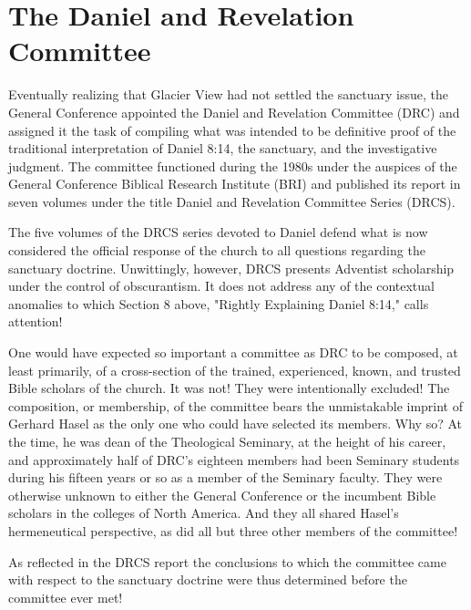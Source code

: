 \chapter{The Daniel and Revelation Committee}
\label{ch:committee}

Eventually realizing that Glacier View had not settled the sanctuary issue,
the General Conference appointed the Daniel and Revelation Committee (DRC)
and assigned it the task of compiling what was intended to be definitive 
proof of the traditional interpretation of Daniel 8:14, the sanctuary, and
the investigative judgment. The committee functioned during the 1980s under
the auspices of the General Conference Biblical Research Institute (BRI) and
published its report in seven volumes under the title Daniel and Revelation
Committee Series (DRCS).

The five volumes of the DRCS series devoted to Daniel defend what is now
considered the official response of the church to all questions regarding
the sanctuary doctrine. Unwittingly, however, DRCS presents Adventist
scholarship under the control of obscurantism. It does not address any of
the contextual anomalies to which Section 8 above, "Rightly Explaining
Daniel 8:14," calls attention!

One would have expected so important a committee as DRC to be composed, at
least primarily, of a cross-section of the trained, experienced, known, and
trusted Bible scholars of the church. It was not! They were intentionally
excluded! The composition, or membership, of the committee bears the
unmistakable imprint of Gerhard Hasel as the only one who could have
selected its members. Why so? At the time, he was dean of the Theological
Seminary, at the height of his career, and approximately half of DRC's
eighteen members had been Seminary students during his fifteen years or so
as a member of the Seminary faculty. They were otherwise unknown to either
the General Conference or the incumbent Bible scholars in the colleges of
North America. And they all shared Hasel's hermeneutical perspective, as did
all but three other members of the committee!

As reflected in the DRCS report the conclusions to which the committee came
with respect to the sanctuary doctrine were thus determined before the
committee ever met!

